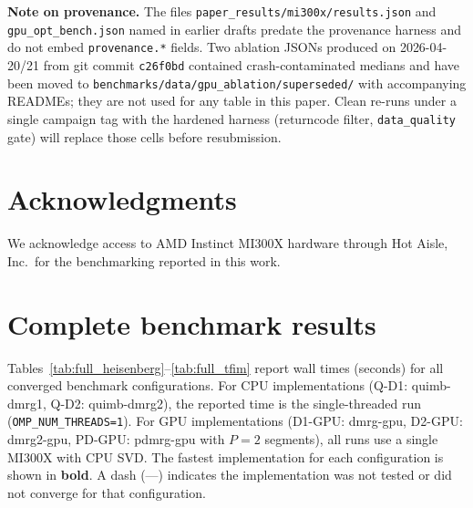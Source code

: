 \documentclass[preprint,12pt]{elsarticle}
\begin{document}
\noindent\textbf{Note on provenance.}
The files \texttt{paper\_results/mi300x/results.json} and
\texttt{gpu\_opt\_bench.json} named in earlier drafts predate the
provenance harness and do not embed \texttt{provenance.*} fields.
Two ablation JSONs produced on 2026-04-20/21 from git commit
\texttt{c26f0bd} contained crash-contaminated medians and have been
moved to \texttt{benchmarks/data/gpu\_ablation/superseded/} with
accompanying READMEs; they are not used for any table in this paper.
Clean re-runs under a single campaign tag with the hardened harness
(returncode filter, \texttt{data\_quality} gate) will replace those
cells before resubmission.

\section*{Acknowledgments}

We acknowledge access to AMD Instinct MI300X hardware through Hot Aisle, Inc.\ for the benchmarking reported in this work.




\appendix
\section{Complete benchmark results}
\label{app:full_results}

Tables~\ref{tab:full_heisenberg}--\ref{tab:full_tfim} report wall times (seconds) for all converged benchmark configurations.
For CPU implementations (Q-D1: quimb-dmrg1, Q-D2: quimb-dmrg2), the reported time is the single-threaded run (\texttt{OMP\_NUM\_THREADS=1}).
For GPU implementations (D1-GPU: dmrg-gpu, D2-GPU: dmrg2-gpu, PD-GPU: pdmrg-gpu with $P = 2$ segments), all runs use a single MI300X with CPU SVD.
The fastest implementation for each configuration is shown in \textbf{bold}.
A dash (---) indicates the implementation was not tested or did not converge for that configuration.
\end{document}
